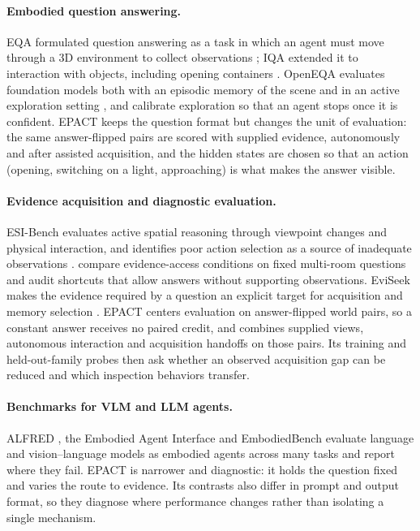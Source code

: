 \documentclass{article}
\begin{document}
\paragraph{Embodied question answering.} EQA formulated question answering as a task in which an agent must move through a 3D environment to collect observations \citep{das2018embodied}; IQA extended it to interaction with objects, including opening containers \citep{gordon2018iqa}. OpenEQA evaluates foundation models both with an episodic memory of the scene and in an active exploration setting \citep{majumdar2024openeqa}, and \citet{ren2024explore} calibrate exploration so that an agent stops once it is confident. EPACT keeps the question format but changes the unit of evaluation: the same answer-flipped pairs are scored with supplied evidence, autonomously and after assisted acquisition, and the hidden states are chosen so that an action (opening, switching on a light, approaching) is what makes the answer visible.

\paragraph{Evidence acquisition and diagnostic evaluation.} ESI-Bench evaluates active spatial reasoning through viewpoint changes and physical interaction, and identifies poor action selection as a source of inadequate observations \citep{hong2026esibench}. \citet{garg2026answering} compare evidence-access conditions on fixed multi-room questions and audit shortcuts that allow answers without supporting observations. EviSeek makes the evidence required by a question an explicit target for acquisition and memory selection \citep{li2026eviseek}. EPACT centers evaluation on answer-flipped world pairs, so a constant answer receives no paired credit, and combines supplied views, autonomous interaction and acquisition handoffs on those pairs. Its training and held-out-family probes then ask whether an observed acquisition gap can be reduced and which inspection behaviors transfer.

\paragraph{Benchmarks for VLM and LLM agents.} ALFRED \citep{shridhar2020alfred}, the Embodied Agent Interface \citep{li2024embodied} and EmbodiedBench \citep{yang2025embodiedbench} evaluate language and vision--language models as embodied agents across many tasks and report where they fail. EPACT is narrower and diagnostic: it holds the question fixed and varies the route to evidence. Its contrasts also differ in prompt and output format, so they diagnose where performance changes rather than isolating a single mechanism.
\end{document}
